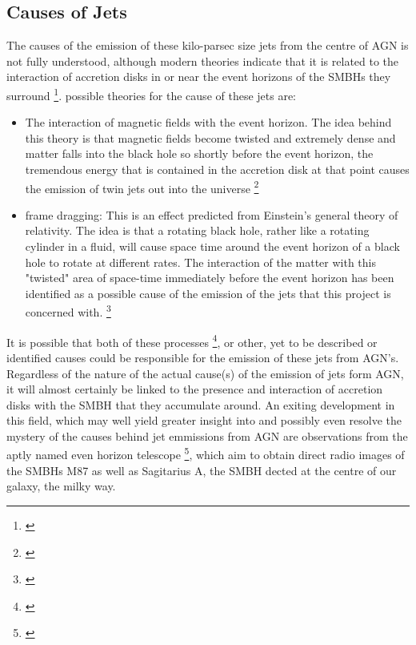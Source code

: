 \documentclass{article}
\begin{document}
\subsection{Causes of Jets}

The causes of the emission of these kilo-parsec size jets from the centre of AGN is not fully understood, although modern theories indicate that it is related to the interaction of accretion disks in or near the event horizons of the SMBHs they surround \footnote{\cite{redjets}}. possible theories for the cause of these jets are:

\begin{itemize}
    \item The interaction of magnetic fields with the event horizon. The idea behind this theory is that magnetic fields become twisted and extremely dense and matter falls into the black hole so shortly before the event horizon, the tremendous energy that is contained in the accretion disk at that point causes the emission of twin jets out into the universe \footnote{\cite{jetcause}}
    \item frame dragging: This is an effect predicted from Einstein's general theory of relativity. The idea is that a rotating black hole, rather like a rotating cylinder in a fluid, will cause space time around the event horizon of a black hole to rotate at different rates. The interaction of the matter with this "twisted" area of space-time immediately before the event horizon has been identified as a possible cause of the emission of the jets that this project is concerned with. \footnote{\cite{framedrag, grav}}
\end{itemize}

It is possible that both of these processes \footnote{\cite{jetspaper}}, or other, yet to be described or identified causes could be responsible for the emission of these jets from AGN's. Regardless of the nature of the actual cause(s) of the emission of jets form AGN, it will almost certainly be linked to the presence and interaction of accretion disks with the SMBH that they accumulate around. An exiting development in this field, which may well yield greater insight into and possibly even resolve the mystery of the causes behind jet emmissions from AGN are observations from the aptly named even horizon telescope \footnote{\cite{eventhorizontelescope}}, which aim to obtain direct radio images of the SMBHs M87 as well as Sagitarius A, the SMBH dected at the centre of our galaxy, the milky way.
\end{document}
